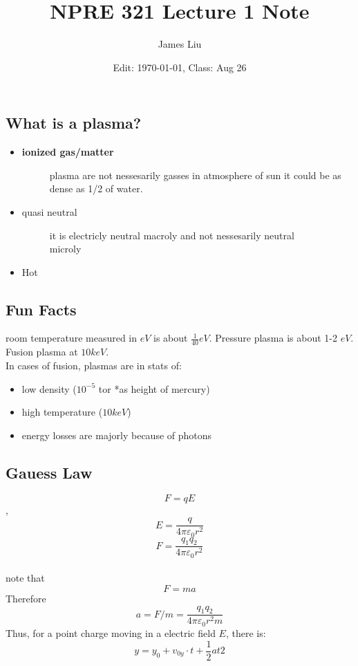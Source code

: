 \documentclass{article}
\date{Edit: \today, Class: Aug 26}
\title{NPRE 321 Lecture 1 Note}
\author{James Liu}
\begin{document}
\maketitle
\subsection*{What is a plasma?}

\begin{itemize}
    \item \bf{ionized gas/matter}
    \begin{description}
        \item[] plasma are not nessesarily gasses in atmosphere of sun it could be as dense as 1/2 of water.
    \end{description}
    \item quasi neutral
    \begin{description}
        \item[] it is electricly neutral macroly and not nessesarily neutral\\ microly 
    \end{description}
    \item Hot
    
\end{itemize}

\subsection*{Fun Facts}
room temperature measured in \(eV\) is about \(\frac{1}{40} eV\). Pressure plasma is about 1-2 \(eV\).
Fusion plasma at \(10k eV\).\\
In cases of fusion, plasmas are in stats of:
\begin{itemize}
    \item low density (\(10^{-5}\) tor *as height of mercury)
    \item high temperature (\(10keV\))
    \item energy losses are majorly because of photons
\end{itemize}
\newpage
\subsection*{Gauess Law}
\[F=qE\],\[E=\frac{q}{4\pi\varepsilon_0r^2}\]
\[F=\frac{q_1q_2}{4\pi\varepsilon_0r^2}\]
\\ note that \[F=ma\]
Therefore \[a=F/m=\frac{q_1q_2}{4\pi\varepsilon_0r^2m}\]
Thus, for a point charge moving in a electric field \(E\), there is:
\[y = y_0 +v_{0y}\cdot t + \frac{1}{2}a t2\]
\end{document}
